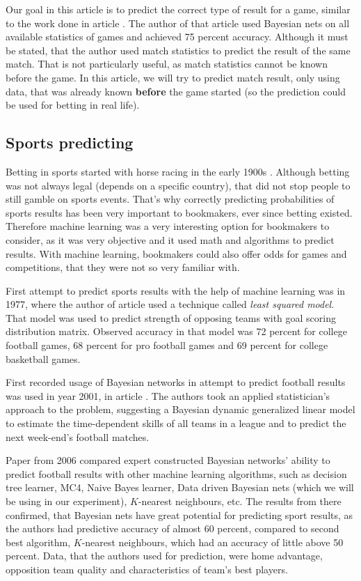 \documentclass[conference]{IEEEtran}
\begin{document}
Our goal in this article is to predict the correct type of result for a game, similar 
to the work done in article \cite{Razali_2017}. The author of that article used Bayesian
nets on all available statistics of games and achieved 75 percent accuracy. Although it must 
be stated, that the author used match statistics to predict the result of the same match. That is not
particularly useful, as match statistics cannot be known before the game. In this article,
we will try to predict match result, only using data, that was already known \textbf{before}
the game started (so the prediction could be used for betting in real life).

\subsection{Sports predicting}

Betting in sports started with horse racing in the early 1900s \cite{lang2016sports}. Although 
betting was not always legal (depends on a specific country), that did not stop people 
to still gamble on sports events. That's why correctly predicting probabilities of sports 
results has been very important to bookmakers, ever since betting existed. Therefore
machine learning was a very interesting option for bookmakers to consider, as it 
was very objective and it used math and algorithms to predict results. With machine 
learning, bookmakers could also offer odds for games and competitions, that they 
were not so very familiar with.

First attempt to predict sports results with the help of machine learning was in
1977, where the author of article \cite{Stefani_1977} used a technique called 
\textit{least squared model}. That model was used to predict strength of opposing 
teams with goal scoring distribution matrix. Observed accuracy in that model 
was 72 percent for college football games, 68 percent for pro 
football games and 69 percent for college basketball games.

First recorded usage of Bayesian networks in attempt to predict football results was used in
year 2001, in article \cite{Rue_2001}. The authors took an applied statistician's 
approach to the problem, suggesting a Bayesian dynamic generalized linear model to 
estimate the time-dependent skills of all teams in a league and to predict the next 
week-end's football matches.

Paper \cite{Joseph_2006} from 2006 compared expert constructed Bayesian networks' 
ability to predict football results with other machine learning algorithms, such as 
decision tree learner, MC4, Naive Bayes learner, Data driven Bayesian nets (which we 
will be using in our experiment), $K$-nearest neighbours, etc. The results from there 
confirmed, that Bayesian nets have great potential for predicting sport results, as the 
authors had predictive accuracy of almost 60 percent, compared to second best algorithm, 
$K$-nearest neighbours, which had an accuracy of little above 50 percent. Data, that 
the authors  used for prediction, were home advantage, opposition team quality and 
characteristics of team's best players.
\end{document}

